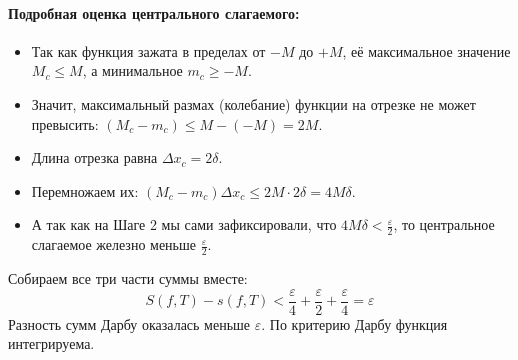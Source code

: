 \paragraph{Подробная оценка центрального слагаемого:}
\begin{itemize}
    \item Так как функция зажата в пределах от $-M$ до $+M$, её максимальное значение $M_c \le M$, а минимальное $m_c \ge -M$. 
    \item Значит, максимальный размах (колебание) функции на отрезке не может превысить: $(M_c - m_c) \le M - (-M) = 2M$.
    \item Длина отрезка равна $\Delta x_c = 2\delta$.
    \item Перемножаем их: $(M_c - m_c)\Delta x_c \le 2M \cdot 2\delta = 4M\delta$.
    \item А так как на Шаге 2 мы сами зафиксировали, что $4M\delta < \frac{\varepsilon}{2}$, то центральное слагаемое железно меньше $\frac{\varepsilon}{2}$.
\end{itemize}

Собираем все три части суммы вместе:
$$ S(f, T) - s(f, T) < \frac{\varepsilon}{4} + \frac{\varepsilon}{2} + \frac{\varepsilon}{4} = \varepsilon $$
Разность сумм Дарбу оказалась меньше $\varepsilon$. По критерию Дарбу функция интегрируема.

\vspace{0.5em}
\begin{center}
\end{center}
\vspace{0.5em}

